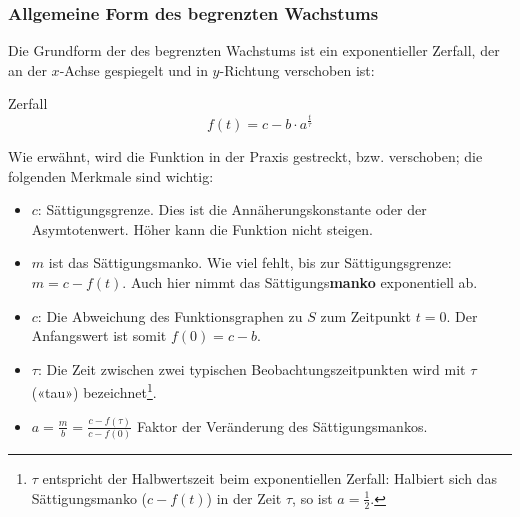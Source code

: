 \subsubsection{Allgemeine Form des begrenzten Wachstums}
\begin{center}
\end{center}

Die Grundform der des begrenzten Wachstums ist ein exponentieller Zerfall,
der an der $x$-Achse gespiegelt und in $y$-Richtung
verschoben ist:

\begin{definition}{Zerfall}{}
$$f(t) =c - b\cdot{} a^{\frac{t}{\tau}}$$
\end{definition}

Wie erwähnt, wird die Funktion in der Praxis gestreckt, bzw. verschoben; die folgenden Merkmale sind wichtig:

\begin{itemize}
	\item $c$: Sättigungsgrenze. Dies ist die Annäherungskonstante oder der Asymtotenwert. Höher kann die Funktion nicht steigen.

	\item $m$ ist das Sättigungsmanko. Wie viel fehlt, bis zur
    Sättigungsgrenze: $m = c - f(t)$. Auch hier nimmt das  Sättigungs\textbf{manko} exponentiell ab.
	\item $c$: Die Abweichung des Funktionsgraphen zu $S$ zum Zeitpunkt $t=0$. Der
    Anfangswert ist somit $f(0) = c - b$.
	\item $\tau$: Die Zeit zwischen zwei typischen Beobachtungszeitpunkten wird
    mit $\tau$ («tau») bezeichnet\footnote{$\tau$ entspricht der
      Halbwertszeit beim exponentiellen Zerfall: Halbiert sich das Sättigungsmanko ($c-f(t)$) in der Zeit $\tau$, so ist $a = \frac12$.}.
    \item $a=\frac{m}{b}=\frac{c-f(\tau)}{c-f(0)}$ Faktor der Veränderung des Sättigungsmankos.
\end{itemize}
\newpage



